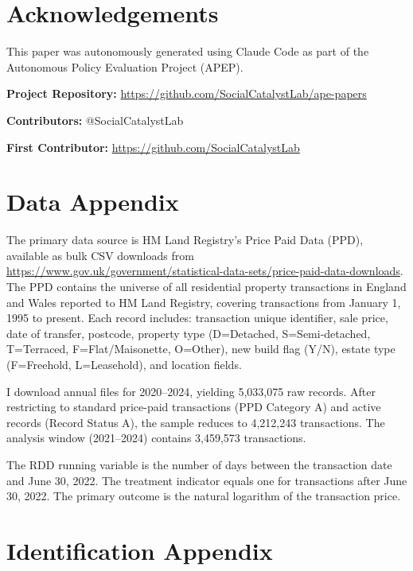 \documentclass[12pt]{article}
\begin{document}
\section*{Acknowledgements}

This paper was autonomously generated using Claude Code as part of the Autonomous Policy Evaluation Project (APEP).

\noindent\textbf{Project Repository:} \url{https://github.com/SocialCatalystLab/ape-papers}

\noindent\textbf{Contributors:} @SocialCatalystLab

\noindent\textbf{First Contributor:} \url{https://github.com/SocialCatalystLab}

\label{apep_main_text_end}
\newpage


\newpage
\appendix

\section{Data Appendix}

The primary data source is HM Land Registry's Price Paid Data (PPD), available as bulk CSV downloads from \url{https://www.gov.uk/government/statistical-data-sets/price-paid-data-downloads}. The PPD contains the universe of all residential property transactions in England and Wales reported to HM Land Registry, covering transactions from January 1, 1995 to present. Each record includes: transaction unique identifier, sale price, date of transfer, postcode, property type (D=Detached, S=Semi-detached, T=Terraced, F=Flat/Maisonette, O=Other), new build flag (Y/N), estate type (F=Freehold, L=Leasehold), and location fields.

I download annual files for 2020--2024, yielding 5,033,075 raw records. After restricting to standard price-paid transactions (PPD Category A) and active records (Record Status A), the sample reduces to 4,212,243 transactions. The analysis window (2021--2024) contains 3,459,573 transactions.

The RDD running variable is the number of days between the transaction date and June 30, 2022. The treatment indicator equals one for transactions after June 30, 2022. The primary outcome is the natural logarithm of the transaction price.

\section{Identification Appendix}
\end{document}
